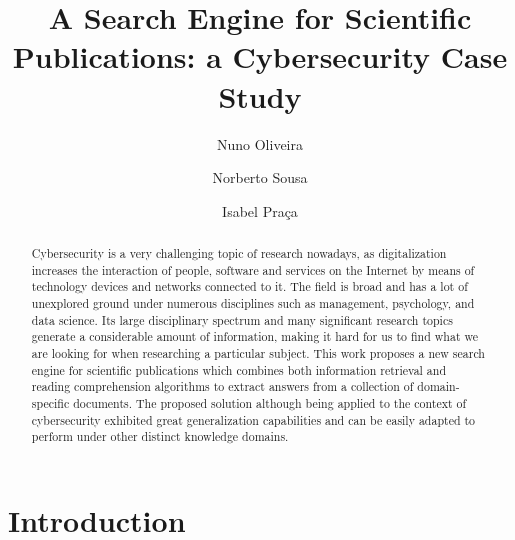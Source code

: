 \documentclass[runningheads]{llncs}
\begin{document}
%
\title{A Search Engine for Scientific Publications: a Cybersecurity Case Study}
%
%
\author{Nuno Oliveira \and
Norberto Sousa \and
Isabel Praça}
%
%

%
\maketitle              %
%
\begin{abstract}
Cybersecurity is a very challenging topic of research nowadays, as digitalization increases the interaction of people, software and services on the Internet by means of technology devices and networks connected to it. The field is broad and has a lot of unexplored ground under numerous disciplines such as management, psychology, and data science. Its large disciplinary spectrum and many significant research topics generate a considerable amount of information, making it hard for us to find what we are looking for when researching a particular subject. This work proposes a new search engine for scientific publications which combines both information retrieval and reading comprehension algorithms to extract answers from a collection of domain-specific documents. The proposed solution although being applied to the context of cybersecurity exhibited great generalization capabilities and can be easily adapted to perform under other distinct knowledge domains.

\end{abstract}
%
%
%

\section{Introduction}
\end{document}
